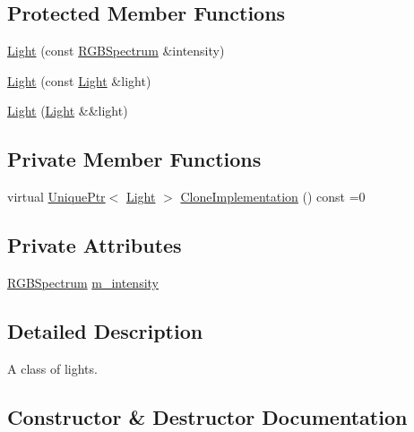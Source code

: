 \subsection*{Protected Member Functions}
\begin{DoxyCompactItemize}
\item 
\hyperlink{classmage_1_1_light_ab470ad4bde2c1e27068541bb53accb0c}{Light} (const \hyperlink{structmage_1_1_r_g_b_spectrum}{R\+G\+B\+Spectrum} \&intensity)
\item 
\hyperlink{classmage_1_1_light_aa91ba3fde50487939d99252c73f732cc}{Light} (const \hyperlink{classmage_1_1_light}{Light} \&light)
\item 
\hyperlink{classmage_1_1_light_a75343c11264fa27c4f166caaf0fec880}{Light} (\hyperlink{classmage_1_1_light}{Light} \&\&light)
\end{DoxyCompactItemize}
\subsection*{Private Member Functions}
\begin{DoxyCompactItemize}
\item 
virtual \hyperlink{namespacemage_a8c307fbcc33bce9b7f2aa4c26c3b95cf}{Unique\+Ptr}$<$ \hyperlink{classmage_1_1_light}{Light} $>$ \hyperlink{classmage_1_1_light_aa613d76a1ebda69efde853d15f75490c}{Clone\+Implementation} () const =0
\end{DoxyCompactItemize}
\subsection*{Private Attributes}
\begin{DoxyCompactItemize}
\item 
\hyperlink{structmage_1_1_r_g_b_spectrum}{R\+G\+B\+Spectrum} \hyperlink{classmage_1_1_light_a4ed8d43c8a4df71671a922d5f04974b8}{m\+\_\+intensity}
\end{DoxyCompactItemize}


\subsection{Detailed Description}
A class of lights. 

\subsection{Constructor \& Destructor Documentation}
\hypertarget{classmage_1_1_light_af877bc473dede83689a4bda8a36d4d36}{}\label{classmage_1_1_light_af877bc473dede83689a4bda8a36d4d36} 
